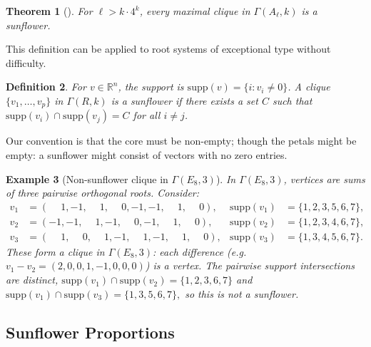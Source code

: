 \documentclass[11pt]{article}
\newtheorem{theorem}{Theorem}[section]
\newtheorem{definition}[theorem]{Definition}
\newtheorem{example}[theorem]{Example}
\begin{document}
\begin{theorem}[\cite{BGO}]\label{BGOmain}
For $\ell > k \cdot 4^k$, every maximal clique in $\Gamma(A_\ell, k)$ is a sunflower.
\end{theorem}

This definition can be applied to root systems of exceptional type without difficulty. 

\begin{definition}\label{def:sunflower}
For $v \in \mathbb{R}^n$, the support is $\mathrm{supp}(v) = \{i : v_i \neq 0\}$. A clique $\{v_1, \ldots, v_p\}$ in $\Gamma(R,k)$ is a \emph{sunflower} if there exists a set $C$ such that $\mathrm{supp}(v_i) \cap \mathrm{supp}(v_j) = C$ for all $i \neq j$.
\end{definition}

Our convention is that the core must be non-empty; though the petals might be empty: a sunflower might consist of vectors with no zero entries. 

\begin{example}[Non-sunflower clique in $\Gamma(E_8, 3)$]\label{ex:sunflower}
In $\Gamma(E_8, 3)$, vertices are sums of three pairwise orthogonal roots. Consider:
\begin{align*}
v_1 &= (\phantom{-}1, -1, \phantom{-}1, \phantom{-}0, -1, -1, \phantom{-}1, \phantom{-}0), & \mathrm{supp}(v_1) &= \{1,2,3,5,6,7\}, \\
v_2 &= (-1, -1, \phantom{-}1, -1, \phantom{-}0, -1, \phantom{-}1, \phantom{-}0), & \mathrm{supp}(v_2) &= \{1,2,3,4,6,7\}, \\
v_3 &= (\phantom{-}1, \phantom{-}0, \phantom{-}1, -1, \phantom{-}1, -1, \phantom{-}1, \phantom{-}0), & \mathrm{supp}(v_3) &= \{1,3,4,5,6,7\}.
\end{align*}
These form a clique in $\Gamma(E_8, 3)$: each difference (e.g.\ $v_1 - v_2 = (2, 0, 0, 1, -1, 0, 0, 0)$) is a vertex. The pairwise support intersections are distinct, $\mathrm{supp}(v_1) \cap \mathrm{supp}(v_2) = \{1,2,3,6,7\}$ and $\mathrm{supp}(v_1) \cap \mathrm{supp}(v_3) = \{1,3,5,6,7\},$ so this is not a sunflower. 
\end{example}

\subsection{Sunflower Proportions}
\end{document}
